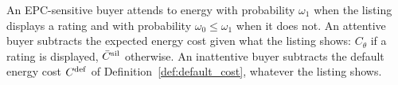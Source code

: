 \label{assum:attention}
An EPC-sensitive buyer attends to energy with probability $\omega_1$ when the listing displays a rating and with probability $\omega_0\le\omega_1$ when it does not. An attentive buyer subtracts the expected energy cost given what the listing shows: $C_\theta$ if a rating is displayed, $\bar C^{\rm sil}$ otherwise. An inattentive buyer subtracts the default energy cost $C^{\rm def}$ of Definition~\ref{def:default_cost}, whatever the listing shows.
